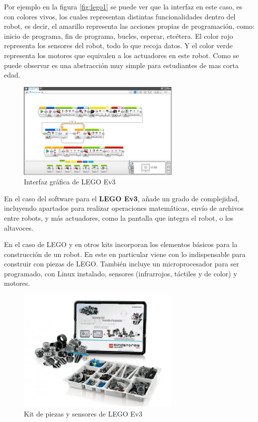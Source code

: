 \begin{itemize}
Por ejemplo en la figura \ref{fig:lego1} se puede ver que la interfaz en este caso, es con colores vivos, los cuales representan distintas funcionalidades dentro del robot, es decir, el amarillo representa las acciones propias de programación, como: inicio de programa, fin de programa, bucles, esperar, etcétera. El color rojo representa los sensores del robot, todo lo que recoja datos. Y el color verde representa los motores que equivalen a los actuadores en este robot.
Como se puede observar es una abstracción muy simple para estudiantes de mas corta edad.
	 \begin{figure}[H]
    \centering
    \includegraphics[width=0.7\textwidth]{img/lego2.jpg}
    \caption{Interfaz gráfica de LEGO Ev3} \label{fig:lego2}
    \end{figure}

En el caso del software para el \textbf{LEGO Ev3}, añade un grado de complejidad, incluyendo apartados para realizar operaciones matemáticas, envío de archivos entre robots, y más actuadores, como la pantalla que integra el robot, o los altavoces.

En el caso de LEGO y en otros kits incorporan los elementos básicos para la construcción de un robot. En este en particular viene con lo indispensable para construir con piezas de LEGO. También incluye un microprocesador para ser programado, con Linux instalado, sensores (infrarrojos, táctiles y de color) y motores.
  \begin{figure}[H]
    \centering
    \includegraphics[width=0.7\textwidth]{img/kitev3.jpg}
    \caption{Kit de piezas y sensores de LEGO Ev3} \label{fig:lego3}
    \end{figure}
\end{itemize}{}


